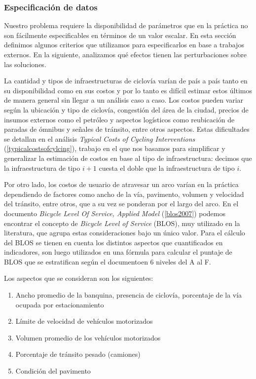 \documentclass{article}
\begin{document}
  \subsubsection{Especificación de datos}

  Nuestro problema requiere la disponibilidad de parámetros que en la práctica no son fácilmente especificables en términos de un valor escalar. En esta sección definimos algunos criterios que utilizamos para especificarlos en base a trabajos externos. En la siguiente, analizamos qué efectos tienen las perturbaciones sobre las soluciones.

  La cantidad y tipos de infraestructuras de ciclovía varían de país a país tanto en su disponibilidad como en sus costos y por lo tanto es difícil estimar estos últimos de manera general sin llegar a un análisis caso a caso. Los costos pueden variar según la ubicación y tipo de ciclovía, congestión del área de la ciudad, precios de insumos externos como el petróleo y aspectos logísticos como reubicación de paradas de ómnibus y señales de tránsito, entre otros aspectos. Estas dificultades se detallan en el análisis {\it Typical Costs of Cycling Interventions} (\ref{typicalcostsofcylcing}), trabajo en el que nos basamos para simplificar y generalizar la estimación de costos en base al tipo de infraestructura: decimos que la infraestructura de tipo $i+1$ cuesta el doble que la infraestructura de tipo $i$.

  Por otro lado, los costos de usuario de atravesar un arco varían en la práctica dependiendo de factores como ancho de la vía, pavimento, volumen y velocidad del tránsito, entre otros, que a su vez se ponderan por el largo del arco. En el documento {\it Bicycle Level Of Service, Applied Model} (\ref{blos2007}) podemos encontrar el concepto de {\it Bicycle Level of Service} (BLOS), muy utilizado en la literatura, que agrupa estas consideraciones bajo un único valor. Para el cálculo del BLOS se tienen en cuenta los distintos aspectos que cuantificados en indicadores, son luego utilizados en una fórmula para calcular el puntaje de BLOS que se estratifican según el documentoen 6 niveles del A al F.

  Los aspectos que se consideran son los siguientes:

  \begin{enumerate}
    \item{Ancho promedio de la banquina, presencia de ciclovía, porcentaje de la vía ocupada por estacionamiento}
    \item{Límite de velocidad de vehículos motorizados}
    \item{Volumen promedio de los vehículos motorizados}
    \item{Porcentaje de tránsito pesado (camiones)}
    \item{Condición del pavimento}
  \end{enumerate}
\end{document}
